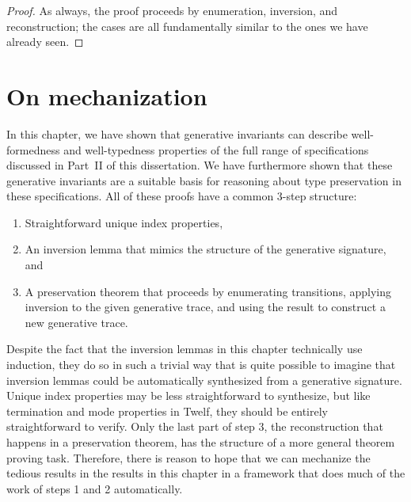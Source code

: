 \begin{proof}
  As always, the proof proceeds by enumeration, inversion, and
  reconstruction; the cases are all fundamentally similar to the ones
  we have already seen.
\end{proof}


\section{On mechanization}
\label{sec:mechanizinggen}

In this chapter, we have shown that generative invariants can describe
well-formedness and well-typedness properties of the full range of
specifications discussed in Part~II of this dissertation. We have
furthermore shown that these generative invariants are a suitable
basis for reasoning about type preservation in these specifications.
All of these proofs have a common 3-step structure: 

\smallskip
\begin{enumerate}
\item Straightforward unique index properties,
\item An inversion lemma that mimics the
  structure of the generative signature, and
\item A preservation theorem that proceeds by enumerating transitions,
applying inversion to the given generative trace, and using the result
to construct a new generative trace.
\end{enumerate}
\smallskip

\noindent
Despite the fact that the inversion lemmas in this chapter technically
use induction, they do so in such a trivial way that is quite possible
to imagine that inversion lemmas could be automatically synthesized
from a generative signature. Unique index properties may be less
straightforward to synthesize, but like termination and mode
properties in Twelf, they should be entirely straightforward to
verify. Only the last part of step 3, the reconstruction that happens
in a preservation theorem, has the structure of a more general theorem
proving task. Therefore, there is reason to hope that we can mechanize the
tedious results in the results in this chapter in a framework that
does much of the work of steps 1 and 2 automatically.




